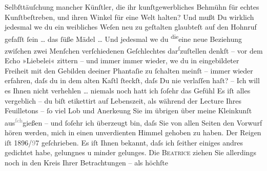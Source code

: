 \begin{ledgroupsized}[t]{13cm}
               Selbſttäuſchung mancher {\pb}Künſtler, die ihr
               kunſtgewerbliches Behmühn für echtes Kunſtbeſtreben, und ihren Winkel für eine Welt
               halten? Und mußt Du wirklich jedesmal we{\geminationn} du ein
               weibliches Weſen neu zu geſtalten glaubteſt auf den Hohnruf gefaſſt ſein {\dots} das ſüße Mädel {\dots} Und jedesmal
                  we{\geminationn} du \substVorne{}\textsuperscript{die}\substDazwischen{}eine neue\substHinten{} Beziehung zwiſchen zwei Menſchen verſchiedenen Geſchlechtes dar\substVorne{}\textsuperscript{ſ}\substDazwischen{}zu\substHinten{}ſtellen {\pb}denkſt – vor dem Echo »Liebelei« zittern – und immer immer wieder, we{\geminationn} du in eingebildeter Freiheit mit den Gebilden deeiner
               Phantaſie zu ſchalten meinſt – immer wieder erfahren, daſs du in dem alten Kaſtl
               ſteckſt, daſs Du nie verlaſſen haſt? – Ich will es Ihnen nicht verhehlen {\dots} niemals noch hatt ich ſoſehr das Gefühl {\pb}Es iſt alles vergeblich – du biſt etikettirt
               auf Lebenszeit, als während der Lecture Ihres Feuilletons – ſo viel Lob und Anerke{\geminationn}ung Sie im übrigen über meine Kleinkunſt aus\substVorne{}\textsuperscript{\textcolor{gray}{ſch}}\substDazwischen{}gi\substHinten{}eßen – und ſoſehr ich überzeugt bin, daſs Sie von allen Seiten den Vorwurf
               hören werden, mich in einen unverdienten Himmel gehoben zu haben. Der Reigen iſt 1896/\textcolor{gray}{9}7 geſchrieben. Es iſt {\pb}Ihnen bekannt, daſs ich ſeither einiges
               andres gedichtet habe, gelungnes u minder gelunges. Die \textsc{Beatrice} ziehen Sie allerdings noch in den Kreis Ihrer Betrachtungen – als höchſte

\end{ledgroupsized}
